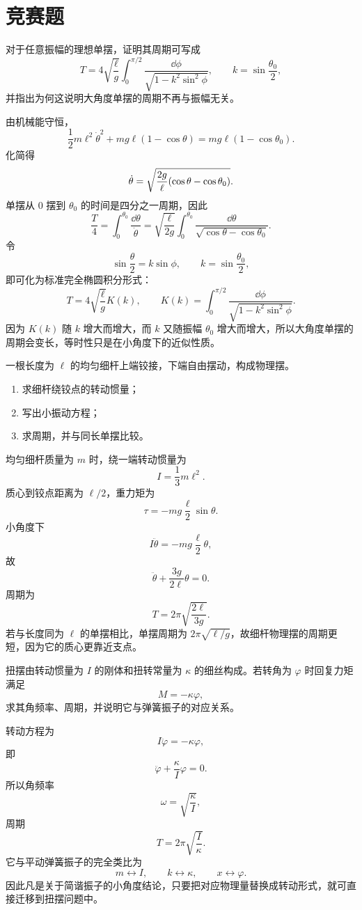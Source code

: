 \section{竞赛题}

\begin{competition}
对于任意振幅的理想单摆，证明其周期可写成
\[
T=4\sqrt{\frac{\ell}{g}}\int_0^{\pi/2}\frac{\dd\phi}{\sqrt{1-k^2\sin^2\phi}},
\qquad k=\sin\frac{\theta_0}{2},
\]
并指出为何这说明大角度单摆的周期不再与振幅无关。
\begin{solution}
由机械能守恒，
\[
\frac12 m\ell^2\dot\theta^2+mg\ell(1-\cos\theta)=mg\ell(1-\cos\theta_0).
\]
化简得
\[
\dot\theta=\sqrt{\frac{2g}{\ell}\qty(\cos\theta-\cos\theta_0)}.
\]
单摆从 $0$ 摆到 $\theta_0$ 的时间是四分之一周期，因此
\[
\frac{T}{4}=\int_0^{\theta_0}\frac{\dd\theta}{\dot\theta}
=\sqrt{\frac{\ell}{2g}}\int_0^{\theta_0}\frac{\dd\theta}{\sqrt{\cos\theta-\cos\theta_0}}.
\]
令
\[
\sin\frac{\theta}{2}=k\sin\phi,
\qquad k=\sin\frac{\theta_0}{2},
\]
即可化为标准完全椭圆积分形式：
\[
T=4\sqrt{\frac{\ell}{g}}K(k),
\qquad
K(k)=\int_0^{\pi/2}\frac{\dd\phi}{\sqrt{1-k^2\sin^2\phi}}.
\]
因为 $K(k)$ 随 $k$ 增大而增大，而 $k$ 又随振幅 $\theta_0$ 增大而增大，所以大角度单摆的周期会变长，等时性只是在小角度下的近似性质。
\end{solution}
\end{competition}

\begin{competition}
一根长度为 $\ell$ 的均匀细杆上端铰接，下端自由摆动，构成物理摆。
\begin{enumerate}
  \item 求细杆绕铰点的转动惯量；
  \item 写出小振动方程；
  \item 求周期，并与同长单摆比较。
\end{enumerate}
\begin{solution}
均匀细杆质量为 $m$ 时，绕一端转动惯量为
\[
I=\frac13 m\ell^2.
\]
质心到铰点距离为 $\ell/2$，重力矩为
\[
\tau=-mg\frac{\ell}{2}\sin\theta.
\]
小角度下
\[
I\ddot\theta=-mg\frac{\ell}{2}\theta,
\]
故
\[
\ddot\theta+\frac{3g}{2\ell}\theta=0.
\]
周期为
\[
T=2\pi\sqrt{\frac{2\ell}{3g}}.
\]
若与长度同为 $\ell$ 的单摆相比，单摆周期为 $2\pi\sqrt{\ell/g}$，故细杆物理摆的周期更短，因为它的质心更靠近支点。
\end{solution}
\end{competition}

\begin{competition}
扭摆由转动惯量为 $I$ 的刚体和扭转常量为 $\kappa$ 的细丝构成。若转角为 $\varphi$ 时回复力矩满足
\[
M=-\kappa\varphi,
\]
求其角频率、周期，并说明它与弹簧振子的对应关系。
\begin{solution}
转动方程为
\[
I\ddot\varphi=-\kappa\varphi,
\]
即
\[
\ddot\varphi+\frac{\kappa}{I}\varphi=0.
\]
所以角频率
\[
\omega=\sqrt{\frac{\kappa}{I}},
\]
周期
\[
T=2\pi\sqrt{\frac{I}{\kappa}}.
\]
它与平动弹簧振子的完全类比为
\[
m\leftrightarrow I,
\qquad k\leftrightarrow \kappa,
\qquad x\leftrightarrow \varphi.
\]
因此凡是关于简谐振子的小角度结论，只要把对应物理量替换成转动形式，就可直接迁移到扭摆问题中。
\end{solution}
\end{competition}

